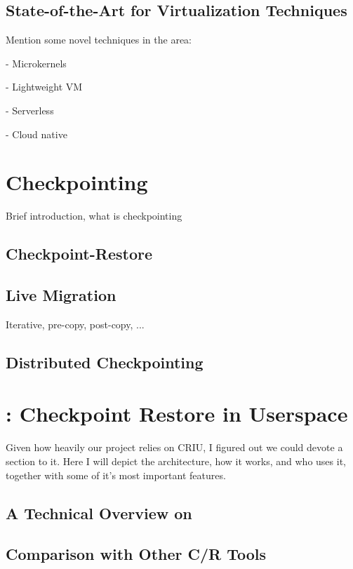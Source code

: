 \subsection{State-of-the-Art for Virtualization Techniques}


Mention some novel techniques in the area:

- Microkernels

- Lightweight VM

- Serverless

- Cloud native

\section{Checkpointing}

Brief introduction, what is checkpointing

\subsection{Checkpoint-Restore}

\subsection{Live Migration}

Iterative, pre-copy, post-copy, ... \cite{Clark2005}

\subsection{Distributed Checkpointing}

\section{\criu: Checkpoint Restore in Userspace}

Given how heavily our project relies on CRIU, I figured out we could devote a section to it.
Here I will depict the architecture, how it works, and who uses it, together with some of it's most important features.

\subsection{A Technical Overview on \criu}

\subsection{Comparison with Other C/R Tools}

